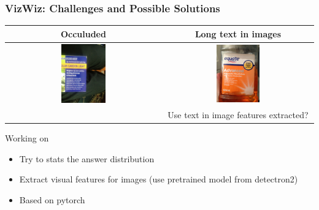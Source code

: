 \documentclass{beamer}
\begin{document}
\begin{frame}
    \frametitle{VizWiz: Challenges and Possible Solutions}

    \begin{table}
        \begin{tabular}{c | c}
        Occuluded & Long text in images\\
        \hline \hline
        \includegraphics[width=0.3\textwidth]{img/vw_occ.jpg} & 
        \includegraphics[width=0.3\textwidth]{img/vw_text.jpg}\\
        & Use text in image features extracted? 
        \end{tabular}
    \end{table}

    
    Working on
    \begin{itemize}
        \item Try to stats the answer distribution
        \item Extract visual features for images (use pretrained model from detectron2)
        \item Based on pytorch
    \end{itemize}

\end{frame}
\end{document}
